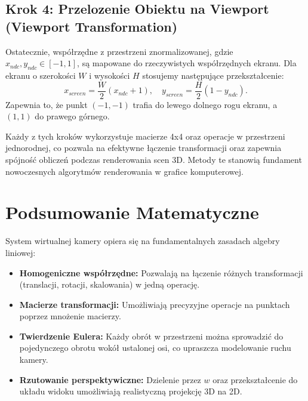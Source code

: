 \documentclass[a4paper,12pt]{article}
\begin{document}
\subsection{Krok 4: Przelozenie Obiektu na Viewport (Viewport Transformation)}
Ostatecznie, współrzędne z przestrzeni znormalizowanej, gdzie \( x_{ndc}, y_{ndc} \in [-1,1] \), są mapowane do rzeczywistych współrzędnych ekranu.
Dla ekranu o szerokości \( W \) i wysokości \( H \) stosujemy następujące przekształcenie:
\[
x_{screen} = \frac{W}{2} \left( x_{ndc} + 1 \right), \quad y_{screen} = \frac{H}{2} \left( 1 - y_{ndc} \right).
\]
Zapewnia to, że punkt \((-1,-1)\) trafia do lewego dolnego rogu ekranu, a \((1,1)\) do prawego górnego.

\bigskip

Każdy z tych kroków wykorzystuje macierze 4x4 oraz operacje w przestrzeni jednorodnej, co pozwala na efektywne łączenie transformacji oraz zapewnia spójność obliczeń podczas renderowania scen 3D. Metody te stanowią fundament nowoczesnych algorytmów renderowania w grafice komputerowej.

\section{Podsumowanie Matematyczne}

System wirtualnej kamery opiera się na fundamentalnych zasadach algebry liniowej:
\begin{itemize}
    \item \textbf{Homogeniczne współrzędne:} Pozwalają na łączenie różnych transformacji (translacji, rotacji, skalowania) w jedną operację.
    \item \textbf{Macierze transformacji:} Umożliwiają precyzyjne operacje na punktach poprzez mnożenie macierzy.
    \item \textbf{Twierdzenie Eulera:} Każdy obrót w przestrzeni można sprowadzić do pojedynczego obrotu wokół ustalonej osi, co upraszcza modelowanie ruchu kamery.
    \item \textbf{Rzutowanie perspektywiczne:} Dzielenie przez \(w\) oraz przekształcenie do układu widoku umożliwiają realistyczną projekcję 3D na 2D.
\end{itemize}
\end{document}
